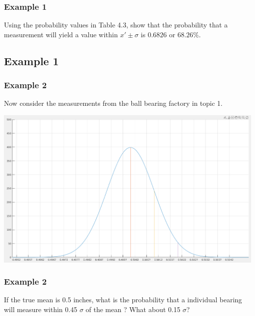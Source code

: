 \documentclass[fleqn]{beamer} %
\newcommand{\sectionIIIsubsectionIItitle}{Example 1}
\newcommand{\sectionIIIsubsectionIIItitle}{Example 2}
\begin{document}
			\begin{frame}
				\frametitle{\sectionIIIsubsectionIItitle}

						Using the probability values in Table 4.3, show that the probability that a measurement will yield a
value within $x'\pm \sigma$ is $0.6826$ or $68.26\%$.

		\vspace{30mm}
	

			\end{frame}

		\subsection{\sectionIIIsubsectionIItitle}\label{sectionIIIsubsectionIII}

			\begin{frame}
				\frametitle{\sectionIIIsubsectionIIItitle}

		Now consider the measurements from the ball bearing factory in topic 1. 
		
		\includegraphics[scale=.2]{images/topic3_fig1.png}	
	
		
			
		
		\vspace{30mm}
		

			\end{frame}

			\begin{frame}
				\frametitle{\sectionIIIsubsectionIIItitle}



	If the true mean is 0.5 inches, what is the probability that a individual bearing will measure within 0.45 $\sigma$ of the mean ? What about 0.15 $\sigma$? \\
		\vspace{30mm}


			\end{frame}
\end{document}
